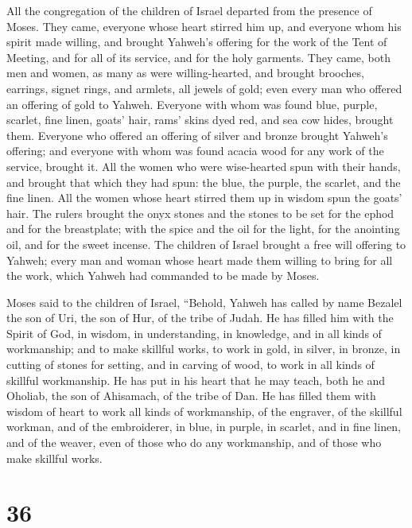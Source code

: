  All the congregation of the children of Israel departed
from the presence of Moses.  They came, everyone whose
heart stirred him up, and everyone whom his spirit made willing, and
brought Yahweh's offering for the work of the Tent of Meeting, and for
all of its service, and for the holy garments.  They came,
both men and women, as many as were willing-hearted, and brought
brooches, earrings, signet rings, and armlets, all jewels of gold; even
every man who offered an offering of gold to Yahweh. 
Everyone with whom was found blue, purple, scarlet, fine linen, goats'
hair, rams' skins dyed red, and sea cow hides, brought them.
 Everyone who offered an offering of silver and bronze
brought Yahweh's offering; and everyone with whom was found acacia wood
for any work of the service, brought it.  All the women who
were wise-hearted spun with their hands, and brought that which they had
spun: the blue, the purple, the scarlet, and the fine linen.
 All the women whose heart stirred them up in wisdom spun
the goats' hair.  The rulers brought the onyx stones and
the stones to be set for the ephod and for the breastplate;
 with the spice and the oil for the light, for the
anointing oil, and for the sweet incense.  The children of
Israel brought a free will offering to Yahweh; every man and woman whose
heart made them willing to bring for all the work, which Yahweh had
commanded to be made by Moses.

 Moses said to the children of Israel, ``Behold, Yahweh has
called by name Bezalel the son of Uri, the son of Hur, of the tribe of
Judah.  He has filled him with the Spirit of God, in
wisdom, in understanding, in knowledge, and in all kinds of workmanship;
 and to make skillful works, to work in gold, in silver, in
bronze,  in cutting of stones for setting, and in carving
of wood, to work in all kinds of skillful workmanship.  He
has put in his heart that he may teach, both he and Oholiab, the son of
Ahisamach, of the tribe of Dan.  He has filled them with
wisdom of heart to work all kinds of workmanship, of the engraver, of
the skillful workman, and of the embroiderer, in blue, in purple, in
scarlet, and in fine linen, and of the weaver, even of those who do any
workmanship, and of those who make skillful works.

\hypertarget{section-35}{%
\section{36}\label{section-35}}

